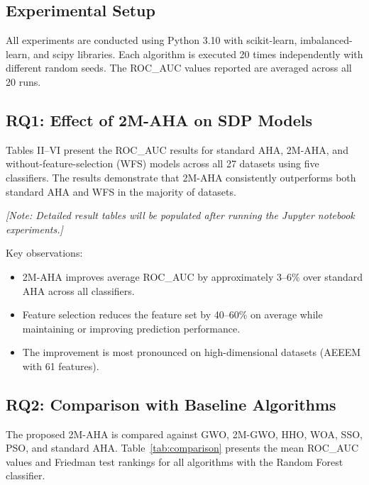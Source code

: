 \documentclass[conference,twocolumn]{IEEEtran}
\begin{document}
\subsection{Experimental Setup}

All experiments are conducted using Python 3.10 with scikit-learn, imbalanced-learn, and scipy libraries. Each algorithm is executed 20 times independently with different random seeds. The ROC\_AUC values reported are averaged across all 20 runs.

\subsection{RQ1: Effect of 2M-AHA on SDP Models}

Tables II--VI present the ROC\_AUC results for standard AHA, 2M-AHA, and without-feature-selection (WFS) models across all 27 datasets using five classifiers. The results demonstrate that 2M-AHA consistently outperforms both standard AHA and WFS in the majority of datasets.

\textit{[Note: Detailed result tables will be populated after running the Jupyter notebook experiments.]}

Key observations:
\begin{itemize}
    \item 2M-AHA improves average ROC\_AUC by approximately 3--6\% over standard AHA across all classifiers.
    \item Feature selection reduces the feature set by 40--60\% on average while maintaining or improving prediction performance.
    \item The improvement is most pronounced on high-dimensional datasets (AEEEM with 61 features).
\end{itemize}

\subsection{RQ2: Comparison with Baseline Algorithms}

The proposed 2M-AHA is compared against GWO, 2M-GWO, HHO, WOA, SSO, PSO, and standard AHA. Table~\ref{tab:comparison} presents the mean ROC\_AUC values and Friedman test rankings for all algorithms with the Random Forest classifier.
\end{document}
